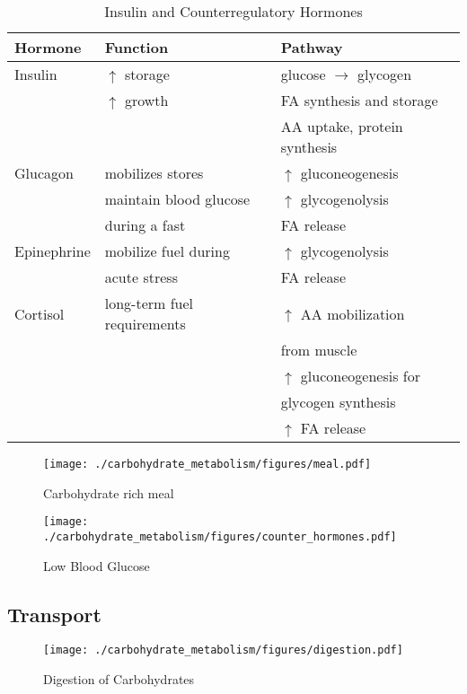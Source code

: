 \documentclass{scrartcl}
\begin{document}
\begin{table}[htbp]
\caption[Insuline and Counterregulatory]{\label{tab:org1e1c659}
Insulin and Counterregulatory Hormones}
\centering
\begin{tabular}{lll}
Hormone & Function & Pathway\\
\hline
Insulin & \(\uparrow\) storage & glucose \(\to\) glycogen\\
 & \(\uparrow\) growth & FA synthesis and storage\\
 &  & AA uptake, protein synthesis\\
\hline
Glucagon & mobilizes stores & \(\uparrow\) gluconeogenesis\\
 & maintain blood glucose & \(\uparrow\) glycogenolysis\\
 & during a fast & FA release\\
\hline
Epinephrine & mobilize fuel during & \(\uparrow\) glycogenolysis\\
 & acute stress & FA release\\
\hline
Cortisol & long-term fuel requirements & \(\uparrow\) AA mobilization\\
 &  & from muscle\\
 &  & \(\uparrow\) gluconeogenesis for\\
 &  & glycogen synthesis\\
 &  & \(\uparrow\) FA release\\
\end{tabular}
\end{table}

\begin{figure}[htbp]
\centering
\texttt{[image: ./carbohydrate\_metabolism/figures/meal.pdf]}
\caption{\label{fig:orga34a9de}
Carbohydrate rich meal}
\end{figure}

\begin{figure}[htbp]
\centering
\texttt{[image: ./carbohydrate\_metabolism/figures/counter\_hormones.pdf]}
\caption{\label{fig:orgd4ec46e}
Low Blood Glucose}
\end{figure}

\subsection{Transport}
\label{sec:org46c28ea}
\begin{figure}[htbp]
\centering
\texttt{[image: ./carbohydrate\_metabolism/figures/digestion.pdf]}
\caption{\label{fig:org0182139}
Digestion of Carbohydrates}
\end{figure}
\end{document}
